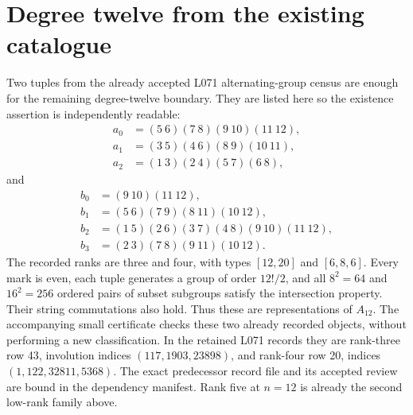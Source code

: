 \documentclass[11pt]{article}
\begin{document}
\section{Degree twelve from the existing catalogue}
Two tuples from the already accepted L071 alternating-group census
are enough for the remaining degree-twelve boundary. They are
listed here so the existence assertion is independently readable:
\begin{align*}
 a_0&=(5\ 6)(7\ 8)(9\ 10)(11\ 12),\\
 a_1&=(3\ 5)(4\ 6)(8\ 9)(10\ 11),\\
 a_2&=(1\ 3)(2\ 4)(5\ 7)(6\ 8),
\end{align*}
and
\begin{align*}
 b_0&=(9\ 10)(11\ 12),\\
 b_1&=(5\ 6)(7\ 9)(8\ 11)(10\ 12),\\
 b_2&=(1\ 5)(2\ 6)(3\ 7)(4\ 8)(9\ 10)(11\ 12),\\
 b_3&=(2\ 3)(7\ 8)(9\ 11)(10\ 12).
\end{align*}
The recorded ranks are three and four, with types $[12,20]$ and
$[6,8,6]$. Every mark is even, each tuple generates a group of
order $12!/2$, and all $8^2=64$ and $16^2=256$ ordered pairs of
subset subgroups satisfy the intersection property. Their string
commutations also hold. Thus these are representations of $A_{12}$.
The accompanying small certificate checks these two already
recorded objects, without performing a new classification. In
the retained L071 records they are rank-three row 43, involution
indices $(117,1903,23898)$, and rank-four row 20, indices
$(1,122,32811,5368)$. The exact predecessor record file and its
accepted review are bound in the dependency manifest. Rank five
at $n=12$ is already the second low-rank family above.
\end{document}
